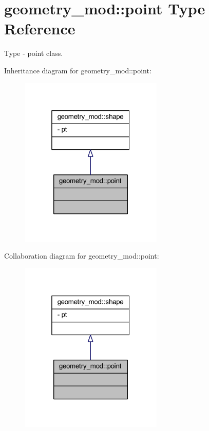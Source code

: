 \hypertarget{structgeometry__mod_1_1point}{}\section{geometry\+\_\+mod\+:\+:point Type Reference}
\label{structgeometry__mod_1_1point}


Type -\/ point class.  




Inheritance diagram for geometry\+\_\+mod\+:\+:point\+:
\nopagebreak
\begin{figure}[H]
\begin{center}
\leavevmode
\includegraphics[width=193pt]{structgeometry__mod_1_1point__inherit__graph}
\end{center}
\end{figure}


Collaboration diagram for geometry\+\_\+mod\+:\+:point\+:
\nopagebreak
\begin{figure}[H]
\begin{center}
\leavevmode
\includegraphics[width=193pt]{structgeometry__mod_1_1point__coll__graph}
\end{center}
\end{figure}


